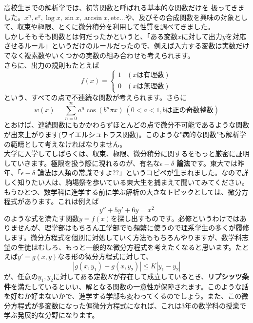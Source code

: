 高校生までの解析学では、初等関数と呼ばれる基本的な関数だけを 扱ってきました。$x^n,e^x,\log x,\sin x,\arcsin x,$etc...や、及びその合成関数を興味の対象として、収束や極限、とくに微分積分を利用して性質を調べてきました。\\
しかしそもそも関数とは何だったかというと、「ある変数$x$に対して出力$y$を対応させるルール」というだけのルールだったので、例えば入力する変数は実数だけでなく複素数やいくつかの実数の組み合わせも考えられます。\\
さらに、出力の規則もたとえば
\begin{equation*}
  f(x) = \begin{cases}
    1 & (xは有理数) \\
    0 & (xは無理数)
  \end{cases}
\end{equation*}
という、すべての点で不連続な関数が考えられます。さらに
\[
　w(x) = \sum_{n=0}^\infty a^n \cos(b^n \pi x) \  (0<a<1,bは正の奇数整数)
\]
とおけば、連続関数にもかかわらずほとんどの点で微分不可能であるような関数が出来上がります(ワイエルシュトラス関数)。このような"病的な関数"も解析学の範疇として考えなければなりません。\\
大学に入学してしばらくは、収束、極限、微分積分に関するをもっと厳密に証明していきます。極限を扱う際に現れるのが、有名な{\bf $\epsilon - \delta$ 論法}です。東大では昨年、「$\epsilon - \delta$ 論法は人類の常識ですよ??」というコピペが生まれました。なので詳しく知りたい人は、駒場祭を歩いている東大生を捕まえて聞いてみてください。\\


もうひとつ、数学科に進学する前に学ぶ解析の大きなトピックとしては、微分方程式があります。これは例えば
\[
y'' + 5y' + 6y = x^2
\]
のような式を満たす関数$y = f(x)$を探し出すものです。必修というわけではありませんが、理学部はもちろん工学部でも頻繁に使うので理系学生の多くが履修します。微分方程式を個別に対処していく方法ももちろんやりますが、数学科志望の生徒はむしろ、もっと一般的な微分方程式を考えたくなると思います。たとえば$y' = g(x,y)$なる形の微分方程式に対して、
\[
|g(x,y_1)-g(x,y_2)| \leq K|y_1 - y_2|
\]
が、任意の$y_1,y_2$に対してある定数$K$が存在して成立しているとき、{\bf リプシッツ条件}を満たしているといい、解となる関数の一意性が保障されます。このような話を好むか好まないかで、進学する学部も変わってくるのでしょう。また、この微分方程式が多変数になった偏微分方程式になれば、これは3年の数学科の授業で学ぶ発展的な分野になります。\\

